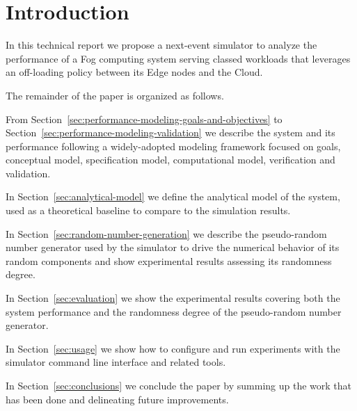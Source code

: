\section{Introduction}
\label{sec:introduction}

In this technical report we propose a next-event simulator to analyze the performance of a Fog computing system serving classed workloads that leverages an off-loading policy between its Edge nodes and the Cloud.


The remainder of the paper is organized as follows.

From Section~\ref{sec:performance-modeling-goals-and-objectives} to Section~\ref{sec:performance-modeling-validation} we describe the system and its performance following a widely-adopted modeling framework focused on goals, conceptual model, specification model, computational model, verification and validation.

In Section~\ref{sec:analytical-model} we define the analytical model of the system, used as a theoretical baseline to compare to the simulation results.

In Section~\ref{sec:random-number-generation} we describe the pseudo-random number generator used by the simulator to drive the numerical behavior of its random components and show experimental results assessing its randomness degree.

In Section~\ref{sec:evaluation} we show the experimental results covering both the system performance and the randomness degree of the pseudo-random number generator.

In Section~\ref{sec:usage} we show how to configure and run experiments with the simulator command line interface and related tools.

In Section~\ref{sec:conclusions} we conclude the paper by summing up the work that has been done and delineating future improvements.
